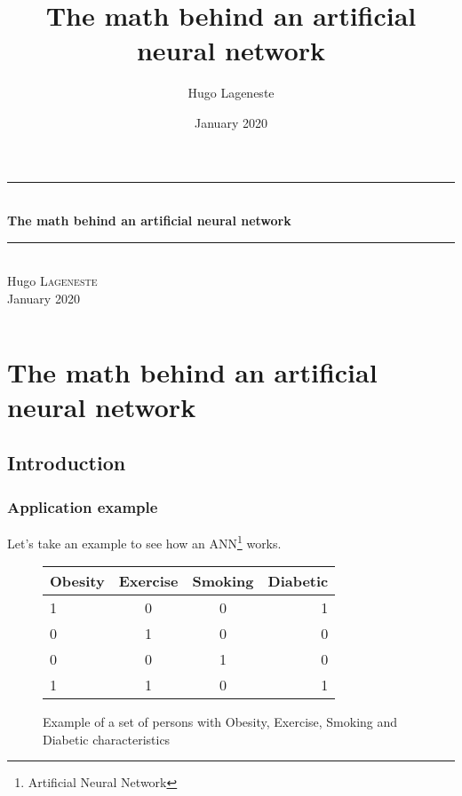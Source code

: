 \documentclass[]{report}
\title{The math behind an artificial neural network}
\author{Hugo Lageneste}
\date{January 2020}
\begin{document}
\begin{titlepage}
    \center
    
    \newcommand{\HRule}{\rule{\linewidth}{0.5mm}}
    \HRule \\[0.4cm]
    {\huge \bfseries The math behind an artificial neural network  }\\[0.1cm]
    \HRule \\[0.4cm]
    
    {Hugo \textsc{Lageneste}}\\[0.5cm]
    {\large January 2020}\\[2cm]
    
    \vfill
    \begin{neuralnetwork}[height=10, nodespacing=25mm, layerspacing=35mm, nodesize=30pt]
        \hiddenlayer[count=6, bias=false]
        \linklayers
        \hiddenlayer[count=6, bias=false]
        \linklayers
        \outputlayer[count=3]
        \linklayers
    \end{neuralnetwork}
    \vfill
\end{titlepage}

\begingroup
\let\cleardoublepage\relax
\let\clearpage\relax

\tableofcontents

\needspace{6cm}
\[\;\]

\vfill

\endgroup

\chapter*{The math behind an artificial neural network}

\setcounter{section}{-1}
\section{Introduction}

\subsection{Application example}

{Let's take an example to see how an ANN\footnote{Artificial Neural Network} works.}

\begin{figure}[H]
    \centering
    \begin{tabular}{|l|c|c|r|}
      \hline
      Obesity & Exercise & Smoking & Diabetic \\
      \hline
      1 & 0 & 0 & 1 \\
      0 & 1 & 0 & 0 \\
      0 & 0 & 1 & 0 \\
      1 & 1 & 0 & 1 \\
      \hline
    \end{tabular}
    \caption{Example of a set of persons with Obesity, Exercise, Smoking and Diabetic characteristics}
\end{figure}
\end{document}
